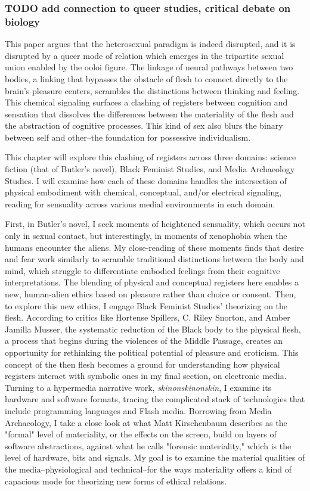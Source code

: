 \documentclass[11pt]{article}
\begin{document}
\subsubsection{{\bfseries\sffamily TODO} add connection to queer studies, critical debate on biology}
\label{sec:org241f699}
This paper argues that the heterosexual paradigm is indeed disrupted,
and it is disrupted by a queer mode of relation which emerges in the
tripartite sexual union enabled by the ooloi figure. The linkage of
neural pathways between two bodies, a linking that bypasses the
obstacle of flesh to connect directly to the brain's pleasure centers,
scrambles the distinctions between thinking and feeling. This chemical
signaling surfaces a clashing of registers between cognition and
sensation that dissolves the differences between the materiality of
the flesh and the abstraction of cognitive processes. This kind of sex
also blurs the binary between self and other--the foundation for
possessive individualism.

This chapter will explore this clashing of registers across three
domains: science fiction (that of Butler's novel), Black Feminist
Studies, and Media Archaeology Studies. I will examine how each of
these domains handles the intersection of physical embodiment with
chemical, conceptual, and/or electrical signaling, reading for
sensuality across various medial environments in each domain. 

First, in Butler's novel, I seek moments of heightened sensuality,
which occurs not only in sexual contact, but interestingly, in moments
of xenophobia when the humans encounter the aliens. My close-reading
of these moments finds that desire and fear work similarly to scramble
traditional distinctions between the body and mind, which struggle to
differentiate embodied feelings from their cognitive
interpretations. The blending of physical and conceptual registers
here enables a new, human-alien ethics based on pleasure rather than
choice or consent. Then, to explore this new ethics, I engage Black
Feminist Studies’ theorizing on the flesh. According to critics like
Hortense Spillers, C. Riley Snorton, and Amber Jamilla Musser, the
systematic reduction of the Black body to the physical flesh, a
process that begins during the violences of the Middle Passage,
creates an opportunity for rethinking the political potential of
pleasure and eroticism. This concept of the then flesh becomes a
ground for understanding how physical registers interact with symbolic
ones in my final section, on electronic media. Turning to a hypermedia
narrative work, \emph{skinonskinonskin}, I examine its hardware and
software formats, tracing the complicated stack of technologies that
include programming languages and Flash media. Borrowing from Media
Archaeology, I take a close look at what Matt Kirschenbaum describes
as the "formal" level of materiality, or the effects on the screen,
build on layers of software abstractions, against what he calls
"forensic materiality," which is the level of hardware, bits and
signals. My goal is to examine the material qualities of the
media--physiological and technical--for the ways materiality offers a
kind of capacious mode for theorizing new forms of ethical relations.
\end{document}
